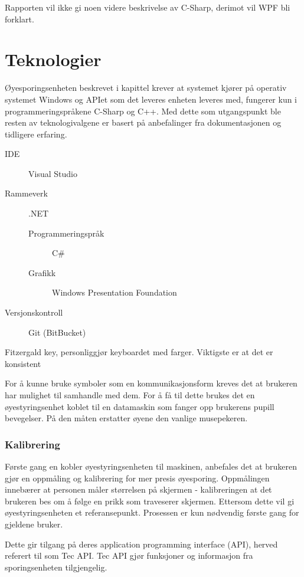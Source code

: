 \documentclass[phd,tocprelim]{cornell}
\begin{document}
Rapporten vil ikke gi noen videre beskrivelse av C-Sharp, derimot vil WPF bli forklart.


\section{Teknologier}

Øyesporingsenheten beskrevet i kapittel  krever at systemet kjører på operativ systemet Windows og APIet som det leveres enheten leveres med,  fungerer kun i programmeringspråkene C-Sharp og C++. Med dette som utgangspunkt ble resten av teknologivalgene er basert på anbefalinger fra dokumentasjonen og tidligere erfaring. 


\begin{description}
  \item[IDE] Visual Studio
  \item[Rammeverk] .NET
  \begin{description}
     \item[Programmeringspråk] C\#
     \item[Grafikk] Windows Presentation Foundation 
\end{description}
  \item[Versjonskontroll] Git (BitBucket)
\end{description}


Fitzergald key, personliggjør keyboardet med farger. Viktigste er at det er konsistent


For å kunne bruke symboler som en kommunikasjonsform kreves det at brukeren har mulighet til samhandle med dem. For å få til dette brukes det en øyestyringsenhet koblet til en datamaskin som fanger opp brukerens pupill bevegelser. På den måten erstatter øyene den vanlige musepekeren.

\subsubsection{Kalibrering}


Første gang en kobler øyestyringsenheten til maskinen, anbefales det at brukeren gjør en oppmåling og kalibrering for mer presis øyesporing. Oppmålingen innebærer at personen måler størrelsen på skjermen - kalibreringen at det brukeren bes om å følge en prikk som traveserer skjermen. Ettersom dette vil gi øyestyringsenheten et referansepunkt. Prosessen er kun nødvendig første gang for gjeldene bruker. 






Dette gir tilgang på deres application programming interface (API), herved referert til som Tec API. Tec API gjør funksjoner og informasjon fra sporingsenheten tilgjengelig. 
\end{document}
